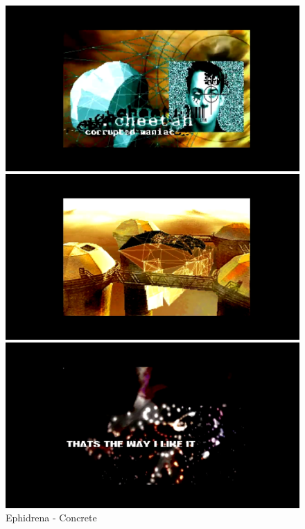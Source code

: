 \begin{figure}[h]
  \begin{minipage}[b]{0.30\linewidth}
    \centering
    \includegraphics[width=\linewidth]{images/demoscene/demos/ephi1.png}
  \end{minipage}
  \hfill
  \begin{minipage}[b]{0.30\linewidth}
    \centering
    \includegraphics[width=\linewidth]{images/demoscene/demos/ephi2.png}
  \end{minipage}
  \hfill
  \begin{minipage}[b]{0.30\linewidth}
    \centering
    \includegraphics[width=\linewidth]{images/demoscene/demos/ephi3.png}
  \end{minipage}
  \caption{Ephidrena - Concrete}
  \label{ephi}
\end{figure}


